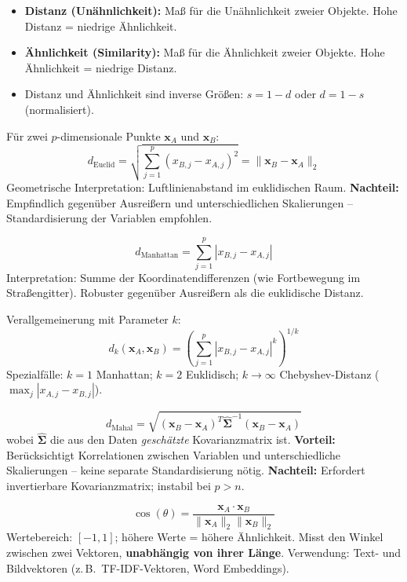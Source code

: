 \begin{itemize}[leftmargin=1.5em]
    \item \textbf{Distanz (Unähnlichkeit):} Maß für die Unähnlichkeit zweier Objekte. Hohe Distanz = niedrige Ähnlichkeit.
    \item \textbf{Ähnlichkeit (Similarity):} Maß für die Ähnlichkeit zweier Objekte. Hohe Ähnlichkeit = niedrige Distanz.
    \item Distanz und Ähnlichkeit sind inverse Größen: $s = 1 - d$ oder $d = 1 - s$ (normalisiert).
\end{itemize}

Für zwei $p$-dimensionale Punkte $\mathbf{x}_A$ und $\mathbf{x}_B$: $$d_{\text{Euclid}} = \sqrt{\sum_{j=1}^{p} (x_{B,j} - x_{A,j})^2} = \|\mathbf{x}_B - \mathbf{x}_A\|_2$$ Geometrische Interpretation: Luftlinienabstand im euklidischen Raum. \textbf{Nachteil:} Empfindlich gegenüber Ausreißern und unterschiedlichen Skalierungen -- Standardisierung der Variablen empfohlen.

$$d_{\text{Manhattan}} = \sum_{j=1}^{p} |x_{B,j} - x_{A,j}|$$
Interpretation: Summe der Koordinatendifferenzen (wie Fortbewegung im Straßengitter). Robuster gegenüber Ausreißern als die euklidische Distanz.

Verallgemeinerung mit Parameter $k$:
$$d_k(\mathbf{x}_A, \mathbf{x}_B) = \left(\sum_{j=1}^{p} |x_{B,j} - x_{A,j}|^k\right)^{1/k}$$ Spezialfälle: $k=1$ Manhattan; $k=2$ Euklidisch; $k \to \infty$ Chebyshev-Distanz ($\max_j |x_{A,j} - x_{B,j}|$).

$$d_{\text{Mahal}} = \sqrt{(\mathbf{x}_B - \mathbf{x}_A)^T \hat{\boldsymbol{\Sigma}}^{-1} (\mathbf{x}_B - \mathbf{x}_A)}$$
wobei $\hat{\boldsymbol{\Sigma}}$ die aus den Daten \emph{geschätzte} Kovarianzmatrix ist. \textbf{Vorteil:} Berücksichtigt Korrelationen zwischen Variablen und unterschiedliche Skalierungen -- keine separate Standardisierung nötig. \textbf{Nachteil:} Erfordert invertierbare Kovarianzmatrix; instabil bei $p > n$.

$$\cos(\theta) = \frac{\mathbf{x}_A \cdot \mathbf{x}_B}{\|\mathbf{x}_A\|_2 \|\mathbf{x}_B\|_2}$$ Wertebereich: $[-1, 1]$; höhere Werte = höhere Ähnlichkeit. Misst den Winkel zwischen zwei Vektoren, \textbf{unabhängig von ihrer Länge}. Verwendung: Text- und Bildvektoren (z.\,B.\ TF-IDF-Vektoren, Word Embeddings).

